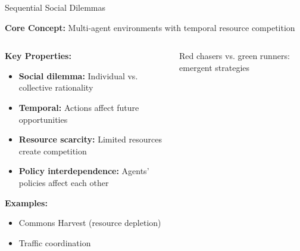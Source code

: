 \documentclass[aspectratio=169]{beamer}
\begin{document}
\begin{frame}{Sequential Social Dilemmas}
    
    \textbf{Core Concept:} Multi-agent environments with temporal resource competition \autocite{leibo_multi-agent_2017}
    
    \begin{columns}
        \begin{column}{0.6\textwidth}
            \textbf{Key Properties:}
            \begin{itemize}
                \item \textbf{Social dilemma:} Individual vs. collective rationality
                \item \textbf{Temporal:} Actions affect future opportunities
                \item \textbf{Resource scarcity:} Limited resources create competition
                \item \textbf{Policy interdependence:} Agents' policies affect each other
            \end{itemize}
            
            \textbf{Examples:}
            \begin{itemize}
                \item Commons Harvest (resource depletion)
                \item Traffic coordination
            \end{itemize}
        \end{column}
        \begin{column}{0.4\textwidth}
            \centering
            \small{Red chasers vs. green runners: emergent strategies}
        \end{column}
    \end{columns}
\end{frame}
\end{document}
